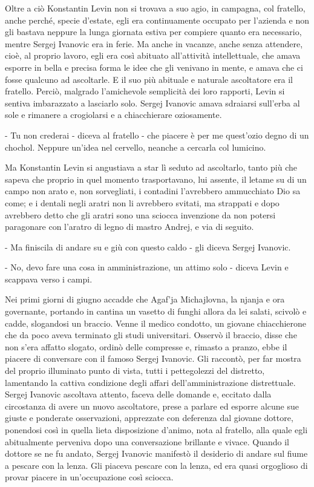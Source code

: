 Oltre a ciò Konstantin Levin non si trovava a suo agio, in campagna, col fratello, anche perché, specie d'estate, egli era continuamente occupato per l'azienda e non gli bastava neppure la lunga giornata estiva per compiere quanto era necessario, mentre Sergej Ivanovic era in ferie. Ma anche in vacanze, anche senza attendere, cioè, al proprio lavoro, egli era così abituato all'attività intellettuale, che amava esporre in bella e precisa forma le idee che gli venivano in mente, e amava che ci fosse qualcuno ad ascoltarle. E il suo più abituale e naturale ascoltatore era il fratello. Perciò, malgrado l'amichevole semplicità dei loro rapporti, Levin si sentiva imbarazzato a lasciarlo solo. Sergej Ivanovic amava sdraiarsi sull'erba al sole e rimanere a crogiolarsi e a chiacchierare oziosamente. 

- Tu non crederai - diceva al fratello - che piacere è per me quest'ozio degno di un chochol. Neppure un'idea nel cervello, neanche a cercarla col lumicino. 

Ma Konstantin Levin si angustiava a star lì seduto ad ascoltarlo, tanto più che sapeva che proprio in quel momento trasportavano, lui assente, il letame su di un campo non arato e, non sorvegliati, i contadini l'avrebbero ammucchiato Dio sa come; e i dentali negli aratri non li avrebbero svitati, ma strappati e dopo avrebbero detto che gli aratri sono una sciocca invenzione da non potersi paragonare con l'aratro di legno di mastro Andrej, e via di seguito. 

- Ma finiscila di andare su e giù con questo caldo - gli diceva Sergej Ivanovic. 

- No, devo fare una cosa in amministrazione, un attimo solo - diceva Levin e scappava verso i campi. 

\label{ii-2} 

Nei primi giorni di giugno accadde che Agaf'ja Michajlovna, la njanja e ora governante, portando in cantina un vasetto di funghi allora da lei salati, scivolò e cadde, slogandosi un braccio. Venne il medico condotto, un giovane chiacchierone che da poco aveva terminato gli studi universitari. Osservò il braccio, disse che non s'era affatto slogato, ordinò delle compresse e, rimasto a pranzo, ebbe il piacere di conversare con il famoso Sergej Ivanovic. Gli raccontò, per far mostra del proprio illuminato punto di vista, tutti i pettegolezzi del distretto, lamentando la cattiva condizione degli affari dell'amministrazione distrettuale. Sergej Ivanovic ascoltava attento, faceva delle domande e, eccitato dalla circostanza di avere un nuovo ascoltatore, prese a parlare ed esporre alcune sue giuste e ponderate osservazioni, apprezzate con deferenza dal giovane dottore, ponendosi così in quella lieta disposizione d'animo, nota al fratello, alla quale egli abitualmente perveniva dopo una conversazione brillante e vivace. Quando il dottore se ne fu andato, Sergej Ivanovic manifestò il desiderio di andare sul fiume a pescare con la lenza. Gli piaceva pescare con la lenza, ed era quasi orgoglioso di provar piacere in un'occupazione così sciocca. 

